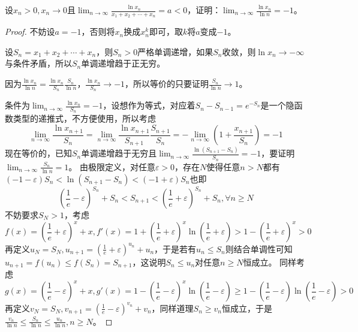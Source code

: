 \documentclass[../../main.tex]{subfiles}%
\begin{document}
\begin{example}
设\(x_n>0,x_n\rightarrow0\)且\(\lim_{n\rightarrow\infty}\frac{\ln x_n}{x_1 + x_2+\cdots + x_n}=a<0\)，证明：\(\lim_{n\rightarrow\infty}\frac{\ln x_n}{\ln n}=-1\)。
\end{example}
\begin{proof}

不妨设\(a = -1\)，否则将\(x_n\)换成\(x_n^k\)即可，取\(k\)将\(a\)变成\(-1\)。

设\(S_n=x_1 + x_2+\cdots + x_n\)，则\(S_n>0\)严格单调递增，如果\(S_n\)收敛，则\(\ln x_n\rightarrow-\infty\)与条件矛盾，所以\(S_n\)单调递增趋于正无穷。

因为\(\frac{\ln x_n}{\ln n}=\frac{\ln x_n}{S_n}\frac{S_n}{\ln n}\)，\(\frac{\ln x_n}{S_n}\rightarrow -1\)，所以等价的只要证明\(\frac{S_n}{\ln n}\rightarrow1\)。

条件为\(\lim_{n\rightarrow\infty}\frac{\ln x_n}{S_n}=-1\)，设想作为等式，对应着\(S_n - S_{n - 1}=e^{-S_n}\)是一个隐函数类型的递推式，不方便使用，所以考虑
\[\lim_{n\rightarrow\infty}\frac{\ln x_{n + 1}}{S_n}=\lim_{n\rightarrow\infty}\frac{\ln x_{n + 1}}{S_{n + 1}}\frac{S_{n + 1}}{S_n}=-\lim_{n\rightarrow\infty}\left(1+\frac{x_{n + 1}}{S_n}\right)=-1\]
现在等价的，已知\(S_n\)单调递增趋于无穷且\(\lim_{n\rightarrow\infty}\frac{\ln(S_{n + 1}-S_n)}{S_n}=-1\)，要证明\(\lim_{n\rightarrow\infty}\frac{S_n}{\ln n}=1\)。
由极限定义，对任意\(\varepsilon>0\)，存在\(N\)使得任意\(n > N\)都有\((-1-\varepsilon)S_n<\ln(S_{n + 1}-S_n)<(-1 + \varepsilon)S_n\)也即
\[\left(\frac{1}{e}-\varepsilon\right)^{S_n}+S_n<S_{n + 1}<\left(\frac{1}{e}+\varepsilon\right)^{S_n}+S_n,\forall n\geqslant  N\]
不妨要求\(S_N>1\)，考虑
\[f(x)=\left(\frac{1}{e}+\varepsilon\right)^{x}+x,f'(x)=1+\left(\frac{1}{e}+\varepsilon\right)^{x}\ln\left(\frac{1}{e}+\varepsilon\right)>1-\left(\frac{1}{e}+\varepsilon\right)^{x}>0\]
再定义\(u_N = S_N,u_{n + 1}=\left(\frac{1}{e}+\varepsilon\right)^{u_n}+u_n\)，于是若有\(u_n\leqslant  S_n\)则结合单调性可知\(u_{n + 1}=f(u_n)\leqslant  f(S_n)=S_{n + 1}\)，这说明\(S_n\leqslant  u_n\)对任意\(n\geqslant  N\)恒成立。
同样考虑
\[g(x)=\left(\frac{1}{e}-\varepsilon\right)^{x}+x,g'(x)=1-\left(\frac{1}{e}-\varepsilon\right)^{x}\ln\left(\frac{1}{e}-\varepsilon\right)\geqslant 1-\left(\frac{1}{e}-\varepsilon\right)\ln\left(\frac{1}{e}-\varepsilon\right)>0\]
再定义\(v_N = S_N,v_{n + 1}=\left(\frac{1}{e}-\varepsilon\right)^{v_n}+v_n\)，同样道理\(S_n\geqslant  v_n\)恒成立，于是\(\frac{v_n}{\ln n}\leqslant \frac{S_n}{\ln n}\leqslant \frac{u_n}{\ln n},n\geqslant  N\)。


\end{proof}
\end{document}
